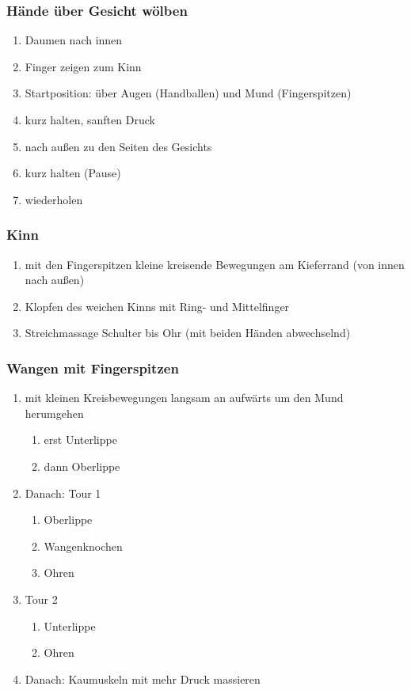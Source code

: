 \subsubsection{Hände über Gesicht wölben}
\begin{enumerate}
\item Daumen nach innen
\item Finger zeigen zum Kinn
\item Startposition: über Augen (Handballen) und Mund (Fingerspitzen)
\item kurz halten, sanften Druck
\item nach außen zu den Seiten des Gesichts
\item kurz halten (Pause)
\item wiederholen
\end{enumerate}

\subsubsection{Kinn}
\begin{enumerate}
\item mit den Fingerspitzen kleine kreisende Bewegungen am Kieferrand (von innen nach außen)
\item Klopfen des weichen Kinns mit Ring- und Mittelfinger
\item Streichmassage Schulter bis Ohr (mit beiden Händen abwechselnd)
\end{enumerate}

\subsubsection{Wangen mit Fingerspitzen}
\begin{enumerate}
\item mit kleinen Kreisbewegungen langsam an aufwärts um den Mund herumgehen
	\begin{enumerate}
	\item erst Unterlippe
	\item dann Oberlippe
	\end{enumerate}
\item Danach: Tour 1
	\begin{enumerate}
	\item Oberlippe
	\item Wangenknochen
	\item Ohren
	\end{enumerate}
\item Tour 2
	\begin{enumerate}
	\item Unterlippe
	\item Ohren
	\end{enumerate}
\item Danach: Kaumuskeln mit mehr Druck massieren
\end{enumerate}

